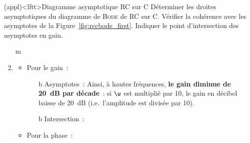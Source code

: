 \documentclass[../../main/main.tex]{subfiles}
\begin{document}
\begin{tcb*}(appl)<lftt>{Diagramme asymptotique RC sur C}
	Déterminer les droites asymptotiques du diagramme de \textsc{Bode} de RC sur
	C. Vérifier la cohérence avec les asymptotes de la
	Figure~\ref{fig:rccbode_first}. Indiquer le point d'intersection des
	asymptotes en gain.
	\tcblower
	\vspace{12pt}
	\begin{enumerate}
		\item[m]
		      \psw{%
			      \[
				      \boxed{
					      \Hu(x) \Sim_{x\to 0} \frac{1}{1 + 0} = 1
					      \qet
					      \Hu(x) \Sim_{x\to \infty} \frac{1}{\jx}
				      }%
			      \]
		      }%
		      \vspace{-15pt}
		\item
		      \begin{itemize}
			      \item Pour le gain~:
			            \begin{itemize}
				            \item[b]{Asymptotes}~:
				                  \psw{%
					                  \[
						                  G\ind{dB}(x) \Sim_{x\to 0} 20 \log (1) = 0
						                  \qet
						                  G\ind{dB}(x) \Sim_{x\to\infty}
						                  20 \log \abs{\frac{1}{\jx}} = -20 \log x
					                  \]
				                  }%
				                  Ainsi, à hautes fréquences, \textbf{le gain diminue
					                  de \SI{20}{dB} par décade}~: si $\w$ est multiplié
				                  par 10, le gain en décibel baisse de \SI{20}{dB}
				                  (i.e.\ l'amplitude est divisée par 10).
				            \item[b]{Intersection}~:
				                  \vspace{-25pt}
			            \end{itemize}
			      \item Pour la phase~:
			            \psw{%
				            \[
					            \f(x) \Sim_{x\to 0} \arg*{1} = 0
					            \qet
					            \f(x) \Sim_{x\to \infty} \arg*{\frac{1}{\jx}} = -\frac{\pi}{2}
				            \]
			            }%
			            \vspace{-15pt}
		      \end{itemize}
	\end{enumerate}
\end{tcb*}
\end{document}
